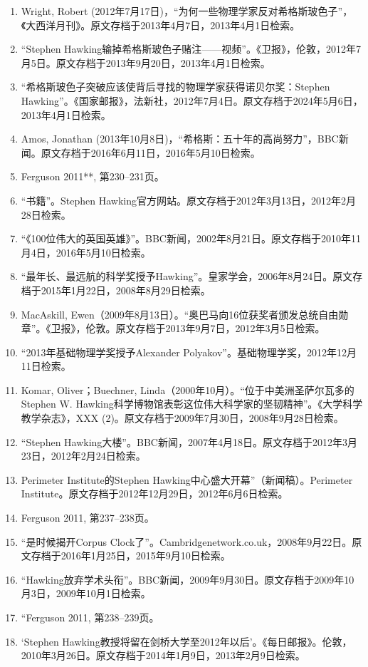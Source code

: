\begin{enumerate}
\item Wright, Robert (2012年7月17日)，“为何一些物理学家反对希格斯玻色子”，《大西洋月刊》。原文存档于2013年4月7日，2013年4月1日检索。  
\item “Stephen Hawking输掉希格斯玻色子赌注——视频”。《卫报》，伦敦，2012年7月5日。原文存档于2013年9月20日，2013年4月1日检索。  
\item “希格斯玻色子突破应该使背后寻找的物理学家获得诺贝尔奖：Stephen Hawking”。《国家邮报》，法新社，2012年7月4日。原文存档于2024年5月6日，2013年4月1日检索。  
\item Amos, Jonathan (2013年10月8日)，“希格斯：五十年的高尚努力”，BBC新闻。原文存档于2016年6月11日，2016年5月10日检索。  
\item Ferguson 2011**, 第230–231页。  
\item “书籍”。Stephen Hawking官方网站。原文存档于2012年3月13日，2012年2月28日检索。
\item “《100位伟大的英国英雄》”。BBC新闻，2002年8月21日。原文存档于2010年11月4日，2016年5月10日检索。  
\item “最年长、最远航的科学奖授予Hawking”。皇家学会，2006年8月24日。原文存档于2015年1月22日，2008年8月29日检索。  
\item MacAskill, Ewen（2009年8月13日）。“奥巴马向16位获奖者颁发总统自由勋章”。《卫报》，伦敦。原文存档于2013年9月7日，2012年3月5日检索。  
\item “2013年基础物理学奖授予Alexander Polyakov”。基础物理学奖，2012年12月11日检索。  
\item Komar, Oliver；Buechner, Linda（2000年10月）。“位于中美洲圣萨尔瓦多的Stephen W. Hawking科学博物馆表彰这位伟大科学家的坚韧精神”。《大学科学教学杂志》，XXX (2)。原文存档于2009年7月30日，2008年9月28日检索。  
\item “Stephen Hawking大楼”。BBC新闻，2007年4月18日。原文存档于2012年3月23日，2012年2月24日检索。  
\item Perimeter Institute的Stephen Hawking中心盛大开幕”（新闻稿）。Perimeter Institute。原文存档于2012年12月29日，2012年6月6日检索。  
\item Ferguson 2011, 第237–238页。  
\item “是时候揭开Corpus Clock了”。Cambridgenetwork.co.uk，2008年9月22日。原文存档于2016年1月25日，2015年9月10日检索。  
\item “Hawking放弃学术头衔”。BBC新闻，2009年9月30日。原文存档于2009年10月3日，2009年10月1日检索。
\item “Ferguson 2011, 第238–239页。  
\item ‘Stephen Hawking教授将留在剑桥大学至2012年以后’。《每日邮报》。伦敦，2010年3月26日。原文存档于2014年1月9日，2013年2月9日检索。  

\end{enumerate}
